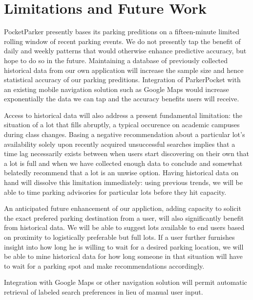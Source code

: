 \section{Limitations and Future Work}
\label{sec-future}



PocketParker presently bases its parking preditions on a fifteen-minute 
limited rolling window of recent parking events. We do not presently tap the
benefit of daily and weekly patterns that would otherwise enhance predictive
accuracy, but hope to do so in the future. Maintaining a database of
previously collected historical data from our own application will increase
the sample size and hence statistical accuracy of our parking preditions.
Integration of ParkerPocket with an existing mobile navigation solution such
as Google Maps would increase exponentially the data we can tap and the
accuracy benefits users will receive.

Access to historical data will also address a present fundamental limitation:
the situation of a lot that fills abruptly, a typical occurence on academic
campuses during class changes. Basing a negative recommendation about a
particular lot's availability solely upon recently acquired unsuccessful
searches implies that a time lag necessarily exists between when users start
discovering on their own that a lot is full and when we have collected enough
data to conclude and somewhat belatedly recommend that a lot is an unwise
option. Having historical data on hand will dissolve this limitation
immediately:  using previous trends, we will be able to time parking
advisories for particular lots before they hit capacity.

An anticipated future enhancement of our appliction, adding capacity to
solicit the exact prefered parking destination from a user, will also
significantly benefit from historical data. We will be able to suggest lots
available to end users based on proximity to logistically preferable but full
lots. If a user further furnishes insight into how long he is willing to wait
for a desired parking location, we will be able to mine historical data for
how long someone in that situation will have to wait for a parking spot and
make recommendations accordingly.

Integration with Google Maps or other navigation solution will permit
automatic retrieval of labeled search preferences in lieu of manual user
input.


